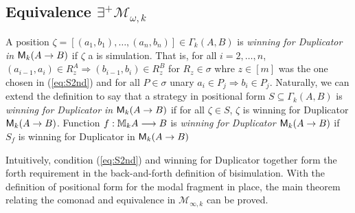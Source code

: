 \subsection{Equivalence $\exists^{+}\mathcal{M}_{\omega,k}$}
\begin{defn}
A position $\zeta = [(a_{1},b_{1}),\dots,(a_{n},b_{n})] \in \Gamma_{k}(A,B)$ is \textit{winning for Duplicator in ${\mathsf{M}_{k}(A \rightarrow B)}$} if $\zeta$ a is simulation. That is, for all $i = 2,\dots,n$, $(a_{i-1},a_{i}) \in R_{z}^{A} \Rightarrow (b_{i-1},b_{i}) \in R_{z}^{B}$ for $R_{z} \in \sigma$ whre $z \in [m]$ was the one chosen in (\ref{eq:S2nd}) and for all $P \in \sigma$ unary $a_{i} \in P_{j} \Rightarrow b_{i} \in P_{j}$. Naturally, we can extend the definition to say that a strategy in positional form $S \subseteq \Gamma_{k}(A,B)$ is \textit{winning for Duplicator in ${\mathsf{M}_{k}(A \rightarrow B)}$} if for all $\zeta \in S$, $\zeta$ is winning for Duplicator ${\mathsf{M}_{k}(A \rightarrow B)}$. Function $f:{\mathbb{M}_{k}A} \longrightarrow B$ is \textit{winning for Duplicator ${\mathsf{M}_{k}(A \rightarrow B)}$} if $S_{f}$ is winning for Duplicator in ${\mathsf{M}_{k}(A \rightarrow B)}$ 
\end{defn}
Intuitively, condition (\ref{eq:S2nd}) and winning for Duplicator together form the forth requirement in the back-and-forth definition of bisimulation. With the definition of positional form for the modal fragment in place, the main theorem relating the comonad and equivalence in $\mathcal{M}_{\infty,k}$ can be proved.  
